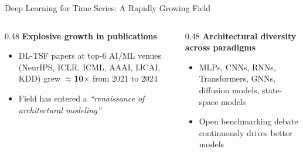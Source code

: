\documentclass[aspectratio=169,11pt]{beamer}
\begin{document}
\begin{frame}{Deep Learning for Time Series: A Rapidly Growing Field}

\begin{columns}[T]

\begin{column}{0.48\textwidth}
  \textbf{Explosive growth in publications}
  \vspace{0.4em}
  \begin{itemize}
    \item DL-TSF papers at top-6 AI/ML venues (NeurIPS, ICLR,
    ICML, AAAI, IJCAI, KDD) grew $\approx$\textbf{10$\times$}
    from 2021 to 2024 \citep{kim2025survey}
    \item Field has entered a \textit{``renaissance of
    architectural modeling''} \citep{kim2025survey}
  \end{itemize}
\end{column}

\hfill

\begin{column}{0.48\textwidth}
  \textbf{Architectural diversity across paradigms}
  \vspace{0.4em}
  \begin{itemize}
    \item MLPs, CNNs, RNNs, Transformers, GNNs, diffusion models,
    state-space models \citep{benidis2022deep, lim2021time}
    \item Open benchmarking debate continuously drives better
    models \citep{zeng2023transformers}
  \end{itemize}
\end{column}

\end{columns}
\end{frame}
\end{document}
